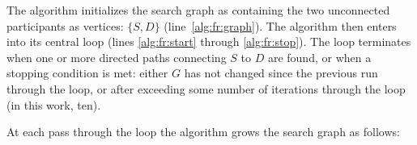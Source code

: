 The algorithm initializes the search graph as containing the two unconnected participants as vertices: $\{S, D\}$ (line~\ref{alg:fr:graph}).
%
The algorithm then enters into its central loop (lines \ref{alg:fr:start} through \ref{alg:fr:stop}). The loop terminates when one or more directed paths connecting $S$ to $D$ are found, or when a stopping condition is met: either $G$ has not changed since the previous run through the loop, or after exceeding some number of iterations through the loop (in this work, ten).

At each pass through the loop the algorithm grows the search graph as follows:

